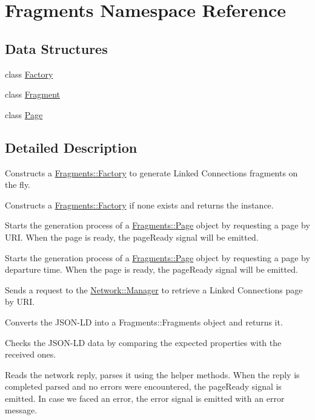 \hypertarget{namespaceFragments}{}\section{Fragments Namespace Reference}
\label{namespaceFragments}
\subsection*{Data Structures}
\begin{DoxyCompactItemize}
\item 
class \mbox{\hyperlink{classFragments_1_1Factory}{Factory}}
\item 
class \mbox{\hyperlink{classFragments_1_1Fragment}{Fragment}}
\item 
class \mbox{\hyperlink{classFragments_1_1Page}{Page}}
\end{DoxyCompactItemize}


\subsection{Detailed Description}
Constructs a \mbox{\hyperlink{classFragments_1_1Factory}{Fragments\+::\+Factory}} to generate Linked Connections fragments on the fly.

Constructs a \mbox{\hyperlink{classFragments_1_1Factory}{Fragments\+::\+Factory}} if none exists and returns the instance.

Starts the generation process of a \mbox{\hyperlink{classFragments_1_1Page}{Fragments\+::\+Page}} object by requesting a page by U\+RI. When the page is ready, the page\+Ready signal will be emitted.

Starts the generation process of a \mbox{\hyperlink{classFragments_1_1Page}{Fragments\+::\+Page}} object by requesting a page by departure time. When the page is ready, the page\+Ready signal will be emitted.

Sends a request to the \mbox{\hyperlink{classNetwork_1_1Manager}{Network\+::\+Manager}} to retrieve a Linked Connections page by U\+RI.

Converts the J\+S\+O\+N-\/\+LD into a Fragments\+::\+Fragments object and returns it.

Checks the J\+S\+O\+N-\/\+LD data by comparing the expected properties with the received ones.

Reads the network reply, parses it using the helper methods. When the reply is completed parsed and no errors were encountered, the page\+Ready signal is emitted. In case we faced an error, the error signal is emitted with an error message.

